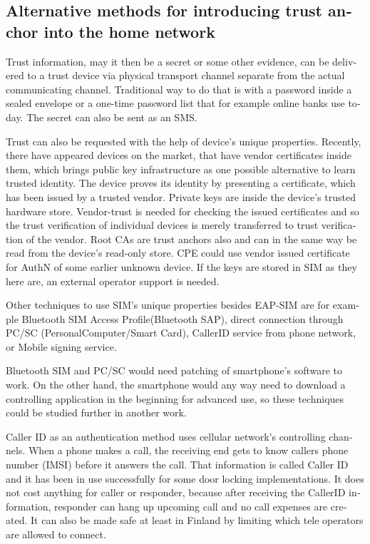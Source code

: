 \documentclass[12pt,a4paper,english]{tutthesis}
\begin{document}
\begin{otherlanguage}{english}
\section{Alternative methods for introducing trust anchor into the home network}
\label{sec-4-1}
\label{sec:altmethods}



 Trust information, may it then be a secret or some
other evidence, can be delivered to a trust device via physical
transport channel separate from the actual communicating channel.
Traditional way to do that is with a password inside a sealed
envelope or a one-time password list that for example online banks 
use today. The secret can also be sent as an SMS.

Trust can also be requested with the help of device's
unique properties. Recently, there have appeared  devices on the market, that
have vendor certificates inside them, which brings public key
infrastructure as one possible alternative to learn trusted identity. 
The device proves its identity by presenting a certificate, which has
been issued by a trusted vendor.  Private keys are inside the device's
trusted hardware store. Vendor-trust is needed for checking the issued certificates
and so the trust verification of individual devices is merely
transferred to trust verification of the vendor.  Root CAs are trust anchors
also and can in the same way be read from the device's read-only store.
CPE could use vendor issued certificate for AuthN of some earlier
unknown device.  If the keys are stored in SIM as they here are, an
external operator support is needed.



Other techniques  to use SIM's unique properties besides EAP-SIM
are for example Bluetooth SIM Access Profile(Bluetooth  SAP), 
direct connection through PC/SC (Personal\-Computer/Smart\- Card),
CallerID service from phone network, or
Mobile signing service.



Bluetooth SIM and PC/SC would need patching of smartphone's software
to work.  On the other hand, the smartphone would any way need to
download  a controlling application
in the beginning for advanced use, so these techniques could be
studied further in another work.

Caller ID as an authentication method uses cellular network's controlling
channels. When a phone makes a call, the receiving end gets 
to know callers phone number (IMSI) before it answers the call.
That information is called Caller ID and it has been in use
successfully for some door locking implementations. 
It does not cost anything for caller or responder,
because after receiving the CallerID  information, responder can hang
up upcoming call and no call expenses are created.
 It can also be made safe at least in Finland
by limiting which tele operators are allowed to connect.

















\end{otherlanguage}
\end{document}
